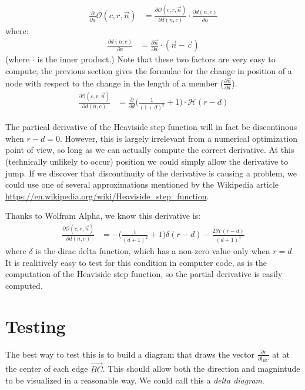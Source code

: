 \documentclass[11pt]{article}
\begin{document}
\begin{align*}
  \frac{\partial}{\partial a}  \mathcal{O}(c,r,\overrightarrow{n}) &=
  \frac{\partial \mathcal{O}(c,r,\overrightarrow{n})}{\partial d(n,c)} \cdot \frac{\partial d(n,c)}{\partial a}
\end{align*}
where:
\begin{align*}
  \frac{\partial d(n,c)}{\partial a} &=  \frac{\partial \overrightarrow{n}}{\partial a} \cdot ({\overrightarrow{n} - \overrightarrow{c}})
\end{align*}
(where $\cdot$ is the inner product.) Note that these two factors are very easy to compute; the previous section gives the formulae
for the change in position of a node with respect to the change in the length of a member ($\frac{\partial \overrightarrow{n}}{\partial a}$).
\begin{align*}  
    \frac{\partial \mathcal{O}(c,r,\overrightarrow{n})}{\partial d(n,c)}  &= \frac{\partial}{\partial d} \big( \frac{1}{(1 + d)^2} + 1\big) \cdot \mathcal{H}(r-d)
\end{align*}

The partical derivative of the Heaviside step function will in fact be discontinous when $r-d = 0$. However,
this is largely irrelevant from a numerical optimization point of view, so long as we can actually compute the
correct derivative. At this (technically unlikely to occur) position we could simply allow the derivative to jump.
If we discover that discontinuity of the derivative is causing a problem, we could use one of several approximations
mentioned by the Wikipedia article \url{https://en.wikipedia.org/wiki/Heaviside_step_function}.

Thanks to Wolfram Alpha, we know this derivative is:
\begin{align*}  
  \frac{\partial \mathcal{O}(c,r,\overrightarrow{n})}{\partial d(n,c)}  &=
  -\big(\frac{1}{(d+1)^2}+1\big)\delta(r-d) - \frac{2\mathcal{H}(r-d)}{(d+1)^3}
\end{align*}
where $\delta$ is the dirac delta function, which has a non-zero value only when $r = d$.
It is realitively easy to test for this condition in computer code, as is the computation
of the Heaviside step function, so the partial derivative
is easily computed.


\section{Testing}

The best way to test this is to build a diagram that draws the vector $\frac{\partial e}{\partial l_{BC}}$ at at the center
of each edge $\vec{BC}$. This should allow both the direction and magnintude to be visualized in a reasonable way.
We could call this a {\em delta diagram}.
\end{document}

